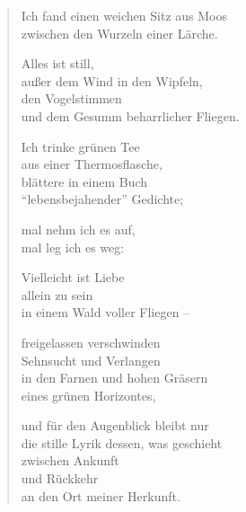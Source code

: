 

\begin{verse}
Ich fand einen weichen Sitz aus Moos\\
zwischen den Wurzeln einer Lärche.

Alles ist still,\\
außer dem Wind in den Wipfeln,\\
den Vogelstimmen\\
und dem Gesumm beharrlicher Fliegen.

Ich trinke grünen Tee\\
aus einer Thermosflasche,\\
blättere in einem Buch\\
"`lebensbejahender"' Gedichte;

mal nehm ich es auf,\\
mal leg ich es weg:

Vielleicht ist Liebe\\
allein zu sein\\
in einem Wald voller Fliegen --

freigelassen verschwinden\\
Sehnsucht und Verlangen\\
in den Farnen und hohen Gräsern\\
eines grünen Horizontes,

und für den Augenblick bleibt nur\\
die stille Lyrik dessen, was geschieht\\
zwischen Ankunft\\
und Rückkehr\\
an den Ort meiner Herkunft.
\end{verse}

